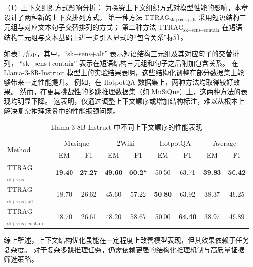 （1）上下文组织方式影响分析：
为探究上下文组织方式对模型性能的影响，本章设计了两种新的上下文排列方式。
第一种方法 $\text{TTRAG}_{\text{sk+sens+alt}}$ 采用短语结构三元组与对应文本句子交替排列的方式；
第二种方法 $\text{TTRAG}_{\text{sk+sens+contain}}$ 在短语结构三元组与文本基础上进一步引入显式的“包含关系”标注。

如表\ref{table:order} 所示，其中，“sk+sens+alt” 表示短语结构三元组及其对应句子的交替排列，
“sk+sens+contain” 表示在短语结构三元组和句子之后附加包含关系。
在 Llama-3-8B-Instruct 模型上的实验结果表明，这些结构化调整在部分数据集上能够带来一定性能提升。
例如，在 HotpotQA 数据集上，两种方法均取得较好效果。  
然而，在更具挑战性的多跳推理数据集（如 MuSiQue）上，这两种方法的表现均明显下降。
这表明，仅通过调整上下文顺序或增加结构标注，难以从根本上解决复杂推理场景中的性能瓶颈问题。

\begin{table}[htbp]
  \centering
  \caption{Llama-3-8B-Instruct 中不同上下文顺序的性能表现}
  \label{table:order}
  \vspace{0.5em}\centering\wuhao
    \begin{tabular}{@{}lcccccccc@{}}
    \toprule[1.5pt]
    \multirow{2}{*}{Method} & \multicolumn{2}{c}{Musique} & \multicolumn{2}{c}{2Wiki} & \multicolumn{2}{c}{HotpotQA} & \multicolumn{2}{c}{Average} \\
      & EM & F1 & EM & F1 & EM & F1 & EM & F1 \\
    \midrule[1pt]
    TTRAG$_\text{sk+sens}$ & \textbf{19.40} & \textbf{27.27}  & \textbf{49.60} & \textbf{60.27}  & 50.50 & 63.71  & \textbf{39.83} & \textbf{50.42}  \\ 
    TTRAG$_\text{sk+sens+alt}$ & 18.70 & 26.62 & 45.60 & 57.22  & \textbf{50.80} & 63.92 & 38.37 & 49.25  \\ 
    TTRAG$_\text{sk+sens+contain}$ & 18.70 & 26.61  & 48.20 & 58.67  & 50.00 & \textbf{64.40}  & 38.97 & 49.89  \\ 
    \bottomrule[1.5pt]
    \end{tabular}%
\end{table}

综上所述，上下文结构优化虽能在一定程度上改善模型表现，但其效果依赖于任务复杂度。
对于复杂多跳推理任务，仍需依赖更强的结构化推理机制与高质量证据筛选策略。

